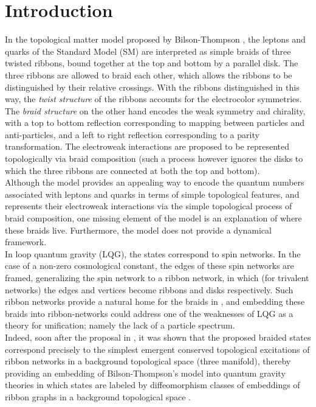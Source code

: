 \documentclass[aps,nofootinbib,amsfonts,superscriptaddress]{revtex4}
\begin{document}
\maketitle

\section{Introduction}
\label{Sec:Introduction}


In the topological matter model proposed by Bilson-Thompson \cite{BT}, the leptons and quarks of the Standard Model (SM) are interpreted as simple braids of three twisted ribbons, bound together at the top and bottom by a parallel disk. The three ribbons are allowed to braid each other, which allows the ribbons to be distinguished by their relative crossings. With the ribbons distinguished in this way, the \textit{twist structure} of the ribbons accounts for the electrocolor symmetries. The \textit{braid structure} on the other hand encodes the weak symmetry and chirality, with a top to bottom reflection corresponding to mapping between particles and anti-particles, and a left to right reflection corresponding to a parity transformation. The electroweak interactions are proposed to be represented topologically via braid composition (such a process however ignores the disks to which the three ribbons are connected at both the top and bottom). \\
%

Although the model provides an appealing way to encode the quantum numbers associated with leptons and quarks in terms of simple topological features, and represents their electroweak interactions via the simple topological process of braid composition, one missing element of the model is an explanation of where these braids live. Furthermore, the model does not provide a dynamical framework. \\
%

In loop quantum gravity (LQG), the states correspond to spin networks. In the case of a non-zero cosmological constant, the edges of these spin networks are framed, generalizing the spin network to a ribbon network, in which (for trivalent networks) the edges and vertices become ribbons and disks respectively. Such ribbon networks provide a natural home for the braids in \cite{BT}, and embedding these braids into ribbon-networks could address one of the weaknesses of LQG as a theory for unification; namely the lack of a particle spectrum. \\
%
Indeed, soon after the proposal in \cite{BT}, it was shown that the proposed braided states correspond precisely to the simplest emergent conserved topological excitations of ribbon networks in a background topological space (three manifold), thereby providing an embedding of Bilson-Thompson's model into quantum gravity theories in which states are labeled by diffeomorphism classes of embeddings of ribbon graphs in a background topological space \cite{BT2}. \\ 
\end{document}
